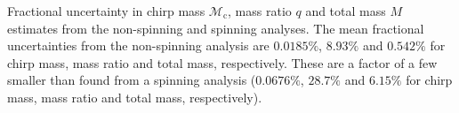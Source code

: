 \label{fig:mass_std} Fractional uncertainty in chirp mass $\mathcal{M}_\mathrm{c}$, mass ratio $q$ and total mass $M$ estimates from the non-spinning and spinning analyses.  The mean fractional uncertainties from the non-spinning analysis are $0.0185\%$, $8.93\%$ and $0.542\%$ for chirp mass, mass ratio and total mass, respectively.  These are a factor of a few smaller than found from a spinning analysis ($0.0676\%$, $28.7\%$ and $6.15\%$ for chirp mass, mass ratio and total mass, respectively).
  
  
  